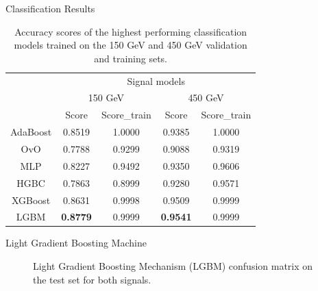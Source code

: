 \documentclass[notes]{beamer}
\begin{document}
	\begin{frame}[t]{Classification Results}
		\begin{table}[htbp!]
			\centering
			\begin{tabular}{ |c|c|c|c|c| }
				\hline \rule{0pt}{13pt}
				\multirow{2}{*}{Model} & \multicolumn{4}{c|}{Signal models} \\
				\cline{2-5} \rule{0pt}{13pt}
				 & \multicolumn{2}{c|}{150 GeV} & \multicolumn{2}{c|}{450 GeV} \\
				\cline{2-5} \rule{0pt}{13pt}
				 & Score & Score\_train & Score & Score\_train \\
				\hline \rule{0pt}{13pt}
				AdaBoost & 0.8519 & 1.0000 & 0.9385 & 1.0000 \\
				\hline \rule{0pt}{13pt}
				OvO & 0.7788 & 0.9299 & 0.9088 & 0.9319 \\
				\hline \rule{0pt}{13pt}
				MLP & 0.8227 & 0.9492 & 0.9350 & 0.9606 \\
				\hline \rule{0pt}{13pt}
				HGBC & 0.7863 & 0.8999 & 0.9280 & 0.9571 \\
				\hline \rule{0pt}{13pt}
				XGBoost & 0.8631 & 0.9998 & 0.9509 & 0.9999 \\
				\hline \rule{0pt}{13pt}
				LGBM & \textbf{0.8779} & 0.9999 & \textbf{0.9541} & 0.9999\\
				\hline
			\end{tabular}	
			\caption{Accuracy scores of the highest performing classification models trained on the 150 GeV and 450 GeV validation and training sets.}
			\label{tab:Validation}
		\end{table}
	\end{frame}


	\begin{frame}[t]{Light Gradient Boosting Machine}
		\begin{figure}[h]
			\centering
			\caption{Light Gradient Boosting Mechanism (LGBM) confusion matrix on the test set for both signals.}
		\end{figure}
	\end{frame}
\end{document}
